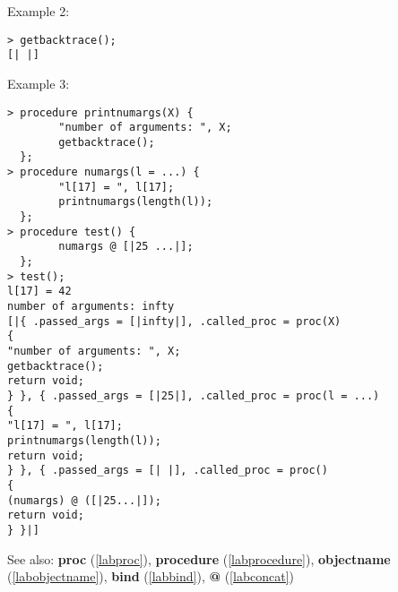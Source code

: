 \noindent Example 2: 
\begin{center}\begin{minipage}{15cm}\begin{Verbatim}[frame=single]
> getbacktrace();
[| |]
\end{Verbatim}
\end{minipage}\end{center}
\noindent Example 3: 
\begin{center}\begin{minipage}{15cm}\begin{Verbatim}[frame=single]
> procedure printnumargs(X) {
        "number of arguments: ", X;
        getbacktrace();
  };
> procedure numargs(l = ...) {
        "l[17] = ", l[17];
        printnumargs(length(l));
  };
> procedure test() {
        numargs @ [|25 ...|];
  };
> test();
l[17] = 42
number of arguments: infty
[|{ .passed_args = [|infty|], .called_proc = proc(X)
{
"number of arguments: ", X;
getbacktrace();
return void;
} }, { .passed_args = [|25|], .called_proc = proc(l = ...)
{
"l[17] = ", l[17];
printnumargs(length(l));
return void;
} }, { .passed_args = [| |], .called_proc = proc()
{
(numargs) @ ([|25...|]);
return void;
} }|]
\end{Verbatim}
\end{minipage}\end{center}
See also: \textbf{proc} (\ref{labproc}), \textbf{procedure} (\ref{labprocedure}), \textbf{objectname} (\ref{labobjectname}), \textbf{bind} (\ref{labbind}), \textbf{@} (\ref{labconcat})
